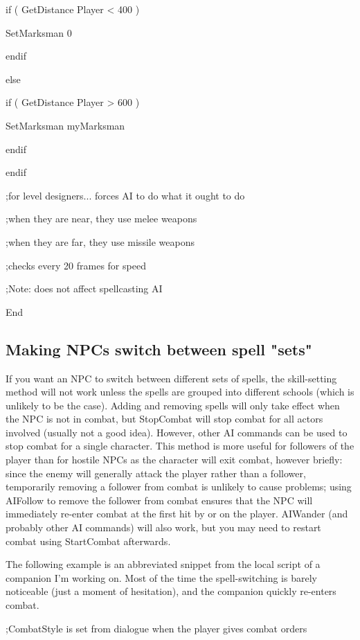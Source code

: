 \documentclass[
]{article}
\begin{document}
if ( GetDistance Player \textless{} 400 )

SetMarksman 0

endif

else

if ( GetDistance Player \textgreater{} 600 )

SetMarksman myMarksman

endif

endif

;for level designers... forces AI to do what it ought to do

;when they are near, they use melee weapons

;when they are far, they use missile weapons

;checks every 20 frames for speed

;Note: does not affect spellcasting AI

End

\hypertarget{making-npcs-switch-between-spell-sets}{%
\subsection{Making NPCs switch between spell
"sets"}\label{making-npcs-switch-between-spell-sets}}

If you want an NPC to switch between different sets of spells, the
skill-setting method will not work unless the spells are grouped into
different schools (which is unlikely to be the case). Adding and
removing spells will only take effect when the NPC is not in combat, but
StopCombat will stop combat for all actors involved (usually not a good
idea). However, other AI commands can be used to stop combat for a
single character. This method is more useful for followers of the player
than for hostile NPCs as the character will exit combat, however
briefly: since the enemy will generally attack the player rather than a
follower, temporarily removing a follower from combat is unlikely to
cause problems; using AIFollow to remove the follower from combat
ensures that the NPC will immediately re-enter combat at the first hit
by or on the player. AIWander (and probably other AI commands) will also
work, but you may need to restart combat using StartCombat afterwards.

The following example is an abbreviated snippet from the local script of
a companion I'm working on. Most of the time the spell-switching is
barely noticeable (just a moment of hesitation), and the companion
quickly re-enters combat.

;CombatStyle is set from dialogue when the player gives combat orders
\end{document}
